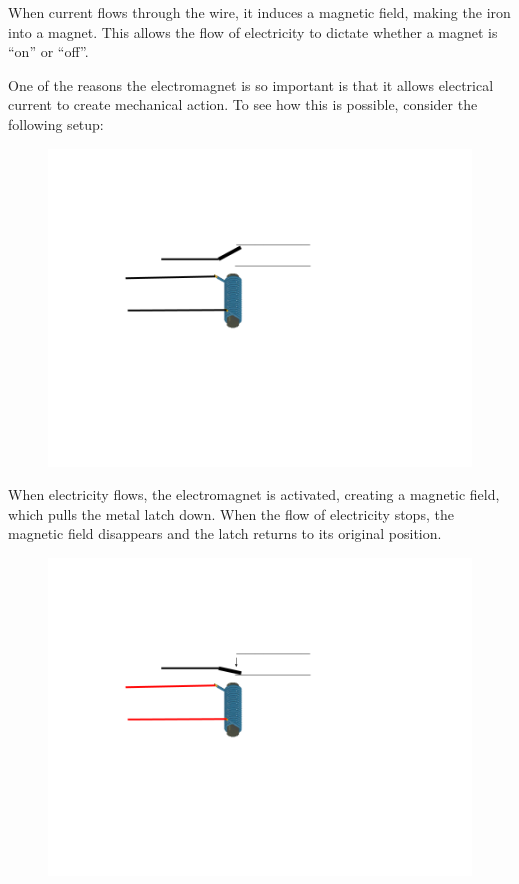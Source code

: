 \documentclass[UTF8]{book}
\begin{document}
\begin{CJK}{UTF8}{gbsn}
When current flows through the wire, it induces a magnetic field, making the iron into a magnet. This allows the flow of electricity to dictate whether a magnet is ``on'' or ``off''.

One of the reasons the electromagnet is so important is that it allows electrical current to create mechanical action. To see how this is possible, consider the following setup:

\begin{figure}[H]
\centering
\includegraphics[width=0.8\linewidth]{electromagnet_with_latch}
\end{figure}

When electricity flows, the electromagnet is activated, creating a magnetic field, which pulls the metal latch down. When the flow of electricity stops, the magnetic field disappears and the latch returns to its original position.

\begin{figure}[H]
\centering
\includegraphics[width=0.8\linewidth]{electromagnet_with_latch_2}
\end{figure}


\end{CJK}
\end{document}
